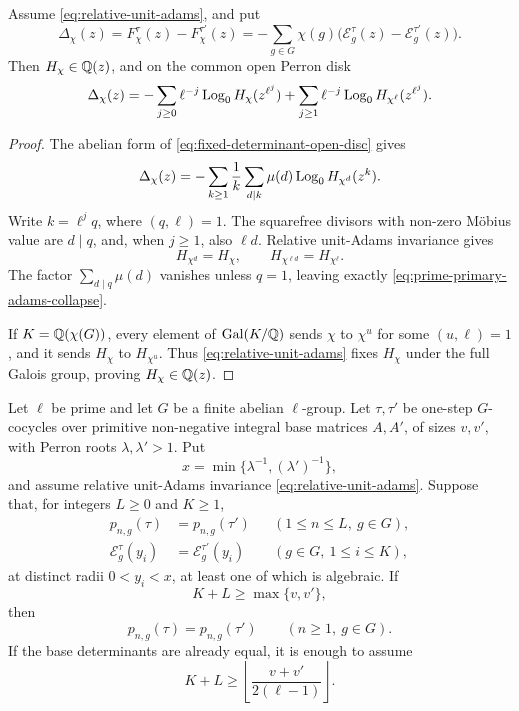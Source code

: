 \begin{lemma}
\label{lem:prime-primary-adams-collapse}
Assume \eqref{eq:relative-unit-adams}, and put
\[
 \Delta_\chi(z)=F_\chi^\tau(z)-F_\chi^{\tau'}(z)
 =-\sum_{g\in G}\chi(g)
  \bigl(\mathcal E_g^\tau(z)-\mathcal E_g^{\tau'}(z)\bigr).
\]
Then \(H_\chi\in\mathbb{Q}(z)\), and on the common open Perron disk
\begin{equation}\label{eq:prime-primary-adams-collapse}
 \Delta_\chi(z)
 =-\sum_{j\ge0}\ell^{-j}\operatorname{Log}_0H_\chi(z^{\ell^j})
  +\sum_{j\ge1}\ell^{-j}\operatorname{Log}_0H_{\chi^\ell}(z^{\ell^j}).
\end{equation}
\end{lemma}

\begin{proof}
The abelian form of \eqref{eq:fixed-determinant-open-disc} gives
\[
 \Delta_\chi(z)
 =-\sum_{k\ge1}\frac1k\sum_{d\mid k}\mu(d)
       \operatorname{Log}_0H_{\chi^d}(z^k).
\]
Write \(k=\ell^j q\), where \((q,\ell)=1\).  The squarefree divisors with
non-zero M\"obius value are \(d\mid q\), and, when \(j\ge1\), also
\(\ell d\).  Relative unit-Adams invariance gives
\[
 H_{\chi^d}=H_\chi,
 \qquad
 H_{\chi^{\ell d}}=H_{\chi^\ell}.
\]
The factor \(\sum_{d\mid q}\mu(d)\) vanishes unless \(q=1\), leaving
exactly \eqref{eq:prime-primary-adams-collapse}.

If \(K=\mathbb{Q}(\chi(G))\), every element of \(\operatorname{Gal}(K/\mathbb{Q})\)
sends \(\chi\) to \(\chi^u\) for some \((u,\ell)=1\), and it sends
\(H_\chi\) to \(H_{\chi^u}\).  Thus \eqref{eq:relative-unit-adams} fixes
\(H_\chi\) under the full Galois group, proving
\(H_\chi\in\mathbb{Q}(z)\).
\end{proof}

\begin{theorem}
\label{thm:prime-primary-collision-jet-rigidity}
Let \(\ell\) be prime and let \(G\) be a finite abelian \(\ell\)-group.
Let \(\tau,\tau'\) be one-step \(G\)-cocycles over primitive non-negative
integral base matrices \(A,A'\), of sizes \(v,v'\), with Perron roots
\(\lambda,\lambda'>1\).  Put
\[
 x=\min\{\lambda^{-1},(\lambda')^{-1}\},
\]
and assume relative unit-Adams invariance
\eqref{eq:relative-unit-adams}.  Suppose that, for integers \(L\ge0\) and
\(K\ge1\),
\begin{align}
 p_{n,g}(\tau)&=p_{n,g}(\tau')
 &&(1\le n\le L,\ g\in G),
 \label{eq:prime-primary-initial-jet}\\
 \mathcal E_g^\tau(y_i)&=\mathcal E_g^{\tau'}(y_i)
 &&(g\in G,\ 1\le i\le K),
 \label{eq:prime-primary-profile-samples}
\end{align}
at distinct radii \(0<y_i<x\), at least one of which is algebraic.
If
\begin{equation}\label{eq:prime-primary-cross-base-threshold}
 K+L\ge\max\{v,v'\},
\end{equation}
then
\[
 p_{n,g}(\tau)=p_{n,g}(\tau')
 \qquad(n\ge1,\ g\in G).
\]
If the base determinants are already equal, it is enough to assume
\begin{equation}\label{eq:prime-primary-fixed-determinant-threshold}
 K+L\ge
 \left\lfloor\frac{v+v'}{2(\ell-1)}\right\rfloor.
\end{equation}
\end{theorem}

